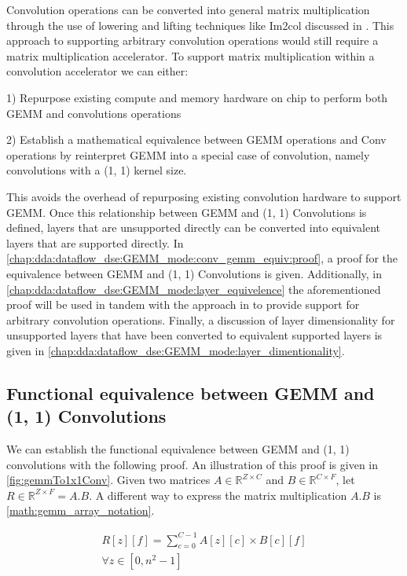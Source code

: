 Convolution operations can be converted into general matrix multiplication
through the use of lowering and lifting techniques like Im2col discussed in
\cite{cafe_con_troll}. This approach
to supporting arbitrary convolution operations would still require a matrix
multiplication accelerator. To support matrix multiplication within a
convolution accelerator we can either:

1) Repurpose existing compute and memory hardware on chip to perform both GEMM
and convolutions operations 

2) Establish a mathematical equivalence between GEMM operations and Conv
operations by reinterpret GEMM into a special case of convolution, namely
convolutions with a (1, 1) kernel size. 

This avoids the overhead of repurposing existing convolution hardware to support
GEMM. Once this relationship between GEMM and (1, 1) Convolutions is defined,
layers that are unsupported directly can be converted into equivalent layers
that are supported directly. In
\autoref{chap:dda:dataflow_dse:GEMM_mode:conv_gemm_equiv:proof}, a proof for the
equivalence between GEMM and (1, 1) Convolutions is given. Additionally, in
\autoref{chap:dda:dataflow_dse:GEMM_mode:layer_equivelence} the aforementioned
proof will be used in tandem with the approach in \cite{cafe_con_troll} to
provide support for arbitrary convolution operations. Finally, a discussion of
layer dimensionality for unsupported layers that have been converted to
equivalent supported layers is given in
\autoref{chap:dda:dataflow_dse:GEMM_mode:layer_dimentionality}.  

\clearpage

\subsection{Functional equivalence between GEMM and (1, 1) Convolutions}
\label{chap:dda:dataflow_dse:GEMM_mode:conv_gemm_equiv:proof}

We can establish the functional equivalence between GEMM and (1, 1) convolutions with
the following proof. An illustration of this proof is given in
\autoref{fig:gemmTo1x1Conv}.  
Given two matrices $A\in \mathbb{R}^{Z \times C}$ and $B \in \mathbb{R}^{C
\times F}$, let $R \in \mathbb{R}^{Z\times F} = A.B$. A different way to express
the matrix multiplication $A.B$ is \autoref{math:gemm_array_notation}.  

\begin{equation}
    \begin{aligned}
        R[z][f] = \displaystyle\sum\limits_{c=0}^{C-1}A[z][c]\times B[c][f] \\ \forall z\in[0, n^2-1]
    \end{aligned}
    \label{math:gemm_array_notation}
\end{equation}


